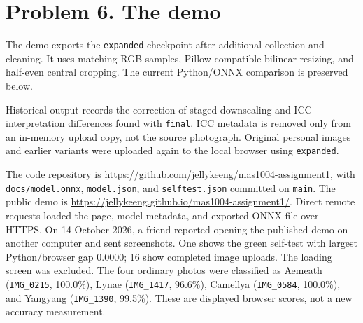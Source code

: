 \documentclass[11pt]{article}
\begin{document}
\section*{Problem 6. The demo}
The demo exports the \texttt{expanded} checkpoint after additional collection and cleaning. It uses matching RGB samples, Pillow-compatible bilinear resizing, and half-even central cropping. The current Python/ONNX comparison is preserved below.

Historical output records the correction of staged downscaling and ICC interpretation differences found with \texttt{final}. ICC metadata is removed only from an in-memory upload copy, not the source photograph. Original personal images and earlier variants were uploaded again to the local browser using \texttt{expanded}.

The code repository is \url{https://github.com/jellykeeng/mas1004-assignment1}, with \texttt{docs/model.onnx}, \texttt{model.json}, and \texttt{selftest.json} committed on \texttt{main}. The public demo is \url{https://jellykeeng.github.io/mas1004-assignment1/}. Direct remote requests loaded the page, model metadata, and exported ONNX file over HTTPS. On 14 October 2026, a friend reported opening the published demo on another computer and sent screenshots. One shows the green self-test with largest Python/browser gap 0.0000; 16 show completed image uploads. The loading screen was excluded. The four ordinary photos were classified as Aemeath (\texttt{IMG\_0215}, 100.0\%), Lynae (\texttt{IMG\_1417}, 96.6\%), Camellya (\texttt{IMG\_0584}, 100.0\%), and Yangyang (\texttt{IMG\_1390}, 99.5\%). These are displayed browser scores, not a new accuracy measurement.
\end{document}
